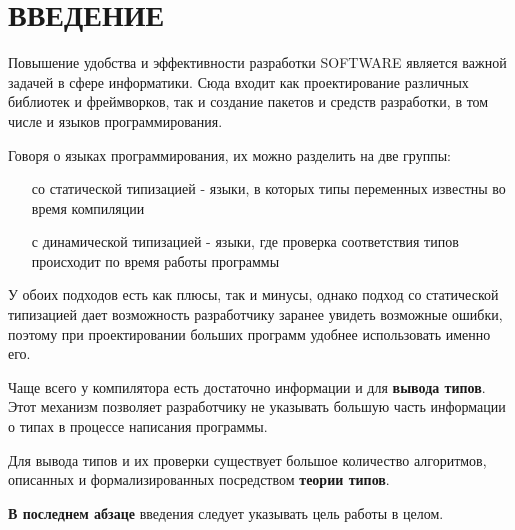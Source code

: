 \chapter*{ВВЕДЕНИЕ}\label{ch:introduction}

Повышение удобства и эффективности разработки \gls{SOFTWARE} является важной задачей в сфере информатики.
Сюда входит как проектирование различных библиотек и фреймворков, так и создание пакетов и средств разработки, в том числе и языков программирования.

Говоря о языках программирования, их можно разделить на две группы:
\begin{itemize}
    \item[со статической типизацией] - языки, в которых типы переменных известны во время компиляции
    \item[с динамической типизацией] - языки, где проверка соответствия типов происходит по время работы программы
\end{itemize}

У обоих подходов есть как плюсы, так и минусы, однако подход со статической типизацией дает возможность разработчику заранее увидеть возможные ошибки, поэтому при проектировании больших программ удобнее использовать именно его.

Чаще всего у компилятора есть достаточно информации и для \textbf{вывода типов}.
Этот механизм позволяет разработчику не указывать большую часть информации о типах в процессе написания программы.

Для вывода типов и их проверки существует большое количество алгоритмов, описанных и формализированных посредством \textbf{теории типов}.


\textbf{В последнем абзаце} введения следует указывать цель работы в целом.

